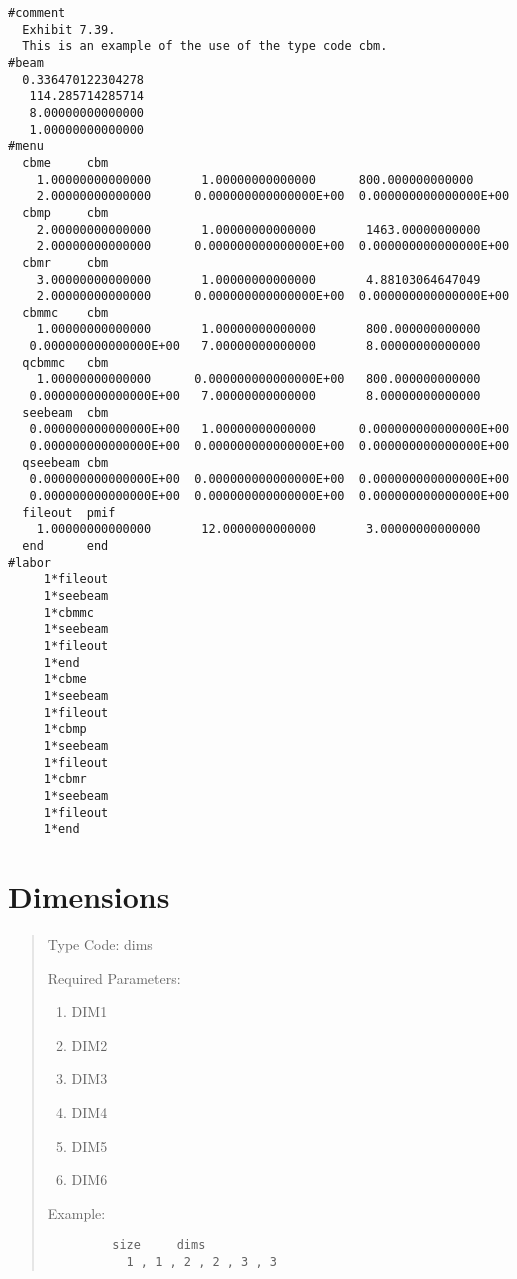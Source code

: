 \begin{footnotesize}
\begin{verbatim}
#comment
  Exhibit 7.39.
  This is an example of the use of the type code cbm.
#beam
  0.336470122304278
   114.285714285714
   8.00000000000000
   1.00000000000000
#menu
  cbme     cbm
    1.00000000000000       1.00000000000000      800.000000000000
    2.00000000000000      0.000000000000000E+00  0.000000000000000E+00
  cbmp     cbm
    2.00000000000000       1.00000000000000       1463.00000000000
    2.00000000000000      0.000000000000000E+00  0.000000000000000E+00
  cbmr     cbm
    3.00000000000000       1.00000000000000       4.88103064647049
    2.00000000000000      0.000000000000000E+00  0.000000000000000E+00
  cbmmc    cbm
    1.00000000000000       1.00000000000000       800.000000000000
   0.000000000000000E+00   7.00000000000000       8.00000000000000
  qcbmmc   cbm
    1.00000000000000      0.000000000000000E+00   800.000000000000
   0.000000000000000E+00   7.00000000000000       8.00000000000000
  seebeam  cbm
   0.000000000000000E+00   1.00000000000000      0.000000000000000E+00
   0.000000000000000E+00  0.000000000000000E+00  0.000000000000000E+00
  qseebeam cbm
   0.000000000000000E+00  0.000000000000000E+00  0.000000000000000E+00
   0.000000000000000E+00  0.000000000000000E+00  0.000000000000000E+00
  fileout  pmif
    1.00000000000000       12.0000000000000       3.00000000000000
  end      end
#labor
     1*fileout
     1*seebeam
     1*cbmmc
     1*seebeam
     1*fileout
     1*end
     1*cbme
     1*seebeam
     1*fileout
     1*cbmp
     1*seebeam
     1*fileout
     1*cbmr
     1*seebeam
     1*fileout
     1*end

\end{verbatim}
\end{footnotesize}

\newpage
\section{Dimensions}
\begin{quotation}
\noindent Type Code:  dims  
\vspace{5mm}

\noindent Required Parameters:
\begin{enumerate}
      \item  DIM1
      \item  DIM2
      \item  DIM3
      \item  DIM4
	  \item  DIM5
	  \item  DIM6
\end{enumerate}

\vspace{5mm}
\noindent Example:
\begin{verbatim}
         size     dims
           1 , 1 , 2 , 2 , 3 , 3
\end{verbatim}
\end{quotation}

